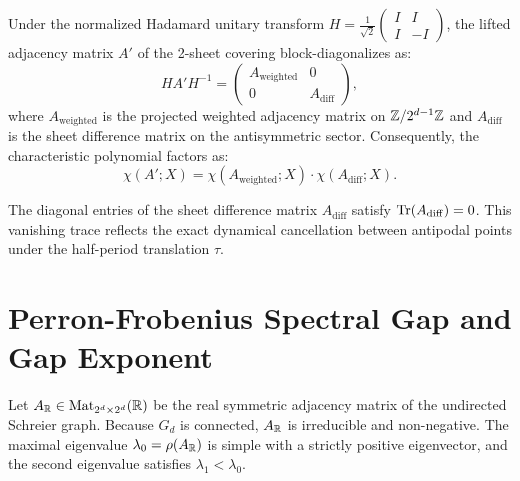 \begin{theorem}
\label{thm:schreier_spectral_decomposition}
\leanok
Under the normalized Hadamard unitary transform $H = \frac{1}{\sqrt{2}} \begin{pmatrix} I & I \\ I & -I \end{pmatrix}$, the lifted adjacency matrix $A'$ of the 2-sheet covering block-diagonalizes as:
\[
H A' H^{-1} = \begin{pmatrix} A_{\mathrm{weighted}} & 0 \\ 0 & A_{\mathrm{diff}} \end{pmatrix},
\]
where $A_{\mathrm{weighted}}$ is the projected weighted adjacency matrix on $\mathbb{Z}/2^{d-1}\mathbb{Z}$ and $A_{\mathrm{diff}}$ is the sheet difference matrix on the antisymmetric sector. Consequently, the characteristic polynomial factors as:
\[
\chi(A'; X) = \chi(A_{\mathrm{weighted}}; X) \cdot \chi(A_{\mathrm{diff}}; X).
\]
\end{theorem}

\begin{theorem}
\label{thm:sheet_diff_trace}
\leanok
The diagonal entries of the sheet difference matrix $A_{\mathrm{diff}}$ satisfy $\mathrm{Tr}(A_{\mathrm{diff}}) = 0$. This vanishing trace reflects the exact dynamical cancellation between antipodal points under the half-period translation $\tau$.
\end{theorem}

\section{Perron-Frobenius Spectral Gap and Gap Exponent}

\begin{theorem}
\label{thm:schreier_perron_frobenius}
\leanok
Let $A_{\mathbb{R}} \in \mathrm{Mat}_{2^d \times 2^d}(\mathbb{R})$ be the real symmetric adjacency matrix of the undirected Schreier graph. Because $G_d$ is connected, $A_{\mathbb{R}}$ is irreducible and non-negative. The maximal eigenvalue $\lambda_0 = \rho(A_{\mathbb{R}})$ is simple with a strictly positive eigenvector, and the second eigenvalue satisfies $\lambda_1 < \lambda_0$.
\end{theorem}

